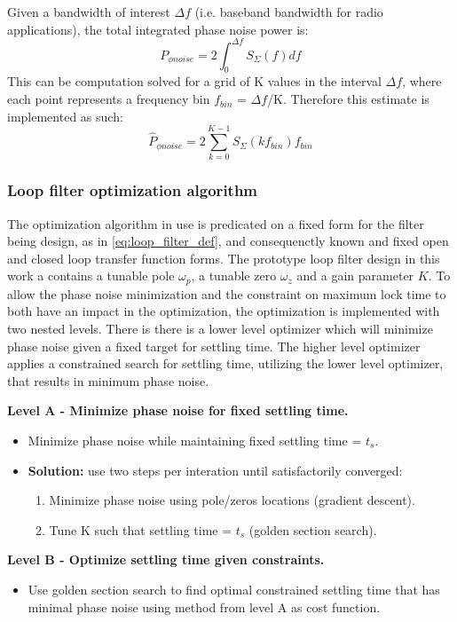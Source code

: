 	Given a bandwidth of interest $\Delta f$ (i.e. baseband bandwidth for radio applications), the total integrated phase noise power is:
	\begin{equation}
		P_{\phi noise} = 2\int_0^{\Delta f} S_{\Sigma}(f)df
	\end{equation}
	This can be computation solved for a grid of K values in the interval $\Delta f$, where each point represents a frequency bin $f_{bin}$ = $\Delta f$/K. Therefore this estimate is implemented as such:
	\begin{equation}
		\hat{P}_{\phi noise} = 2\sum_{k=0}^{K-1} S_{\Sigma}(kf_{bin})f_{bin}
	\end{equation}

\subsubsection{Loop filter optimization algorithm}
	The optimization algorithm in use is predicated on a fixed form for the filter being design, as in \ref{eq:loop_filter_def}, and consequenctly known and fixed open and closed loop transfer function forms. The prototype loop filter design in this work a contains a tunable pole $\omega_p$, a tunable zero $\omega_z$ and a gain parameter $K$. To allow the phase noise minimization and the constraint on maximum lock time to both have an impact in the optimization, the optimization is implemented with two nested levels. There is there is a lower level optimizer which will minimize phase noise given a fixed target for settling time. The higher level optimizer applies a constrained search for settling time, utilizing the lower level optimizer, that results in minimum phase noise. 

	\textbf{Level A - Minimize phase noise for fixed settling time.}\label{lf_opt}
	\begin{itemize}
		\setlength\itemsep{-0.8em}
		\item Minimize phase noise while maintaining fixed settling time = $t_s$.
		\item \textbf{Solution:} use two steps per interation until satisfactorily converged:
		\begin{enumerate}
			\setlength\itemsep{-0.8em}
			\item Minimize phase noise using pole/zeros locations (gradient descent).
			\item Tune K such that settling time = $t_s$ (golden section search).
		\end{enumerate}

	\end{itemize}
	\textbf{Level B - Optimize settling time given constraints.}
	\begin{itemize}
		\setlength\itemsep{-0.8em}
		\item Use golden section search to find optimal constrained settling time that has minimal phase noise using method from level A as cost function.
	\end{itemize} 

